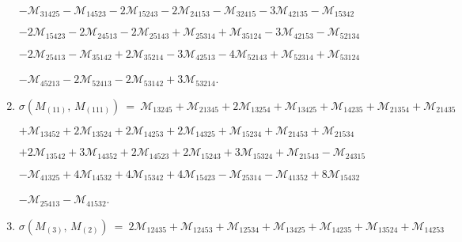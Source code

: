 \documentclass[12pt]{article}
\newcommand{\M}{\mathcal{M}}
\begin{document}
\begin{enumerate}
      \hspace{10pt}
      $-\M_{31425} 
       -\M_{14523} -2\M_{15243} 
       -2\M_{24153} -\M_{32415} 
       -3\M_{42135} -\M_{15342} $\vspace{-6pt}

      \hspace{10pt}
      $-2\M_{15423} -2\M_{24513} 
       -2\M_{25143} +\M_{25314} 
       +\M_{35124} -3\M_{42153} 
       -\M_{52134} $\vspace{-6pt}

      \hspace{10pt}
      $-2\M_{25413} 
       -\M_{35142} +2\M_{35214} 
       -3\M_{42513} -4\M_{52143} 
       +\M_{52314} +\M_{53124} $\vspace{-6pt}

      \hspace{10pt}
      $-\M_{45213} -2\M_{52413} 
       -2\M_{53142} +3\M_{53214} $.\vspace{-8pt}
\item[]\hspace{-50pt}$\sigma(M_{(11)},\,M_{(111)})\ =\ 
        \M_{13245} +\M_{21345} 
       +2\M_{13254} +\M_{13425} 
       +\M_{14235} +\M_{21354} 
       +\M_{21435} $\vspace{-6pt}

      \hspace{10pt}
      $+\M_{13452} 
       +2\M_{13524} +2\M_{14253} 
       +2\M_{14325} +\M_{15234} 
       +\M_{21453} +\M_{21534} $\vspace{-6pt}

      \hspace{10pt}
      $+2\M_{13542} +3\M_{14352} 
       +2\M_{14523} +2\M_{15243} 
       +3\M_{15324} +\M_{21543} 
       -\M_{24315} $\vspace{-6pt}

      \hspace{10pt}
      $-\M_{41325} 
       +4\M_{14532} +4\M_{15342} 
       +4\M_{15423} -\M_{25314} 
       -\M_{41352} +8\M_{15432} $\vspace{-6pt}

      \hspace{10pt}
      $-\M_{25413} -\M_{41532} $.\vspace{-8pt}
\item[]\hspace{-50pt}$\sigma(M_{(3)},\,M_{(2)})\ =\ 
        2\M_{12435} +\M_{12453} 
       +\M_{12534} +\M_{13425} 
       +\M_{14235} +\M_{13524} 
       +\M_{14253} $\vspace{-6pt}


\end{enumerate}
\end{document}
